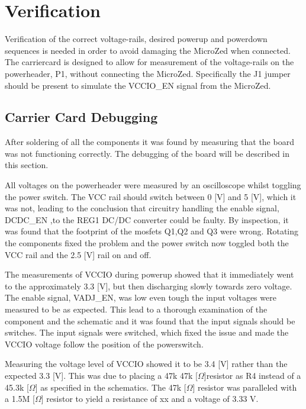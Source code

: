\section{Verification}
Verification of the correct voltage-rails, desired powerup and powerdown sequences is needed in order to avoid damaging the MicroZed when connected.
The carriercard is designed to allow for measurement of the voltage-rails on the powerheader, P1, without connecting the MicroZed.
Specifically the J1 jumper should be present to simulate the VCCIO\_EN signal from the MicroZed.

\subsection{Carrier Card Debugging}
After soldering of all the components it was found by measuring that the board was not functioning correctly.
The debugging of the board will be described in this section.

All voltages on the powerheader were measured by an oscilloscope whilst toggling the power switch.
The VCC rail should switch between 0 [V] and 5 [V], which it was not, leading to the conclusion that circuitry handling the enable signal, DCDC\_EN ,to the REG1 DC/DC converter could be faulty.
By inspection, it was found that the footprint of the mosfets Q1,Q2 and Q3 were wrong.
Rotating the components fixed the problem and the power switch now toggled both the VCC rail and the 2.5 [V] rail on and off.

The measurements of VCCIO during powerup showed that it immediately went to the approximately 3.3 [V], but then discharging slowly towards zero voltage.
The enable signal, VADJ\_EN, was low even tough the input voltages were measured to be as expected.
This lead to a thorough examination of the component and the schematic and it was found that the input signals should be switches.
The input signals were switched, which fixed the issue and made the VCCIO voltage follow the position of the powerswitch.

Measuring the voltage level of VCCIO showed it to be 3.4 [V] rather than the expected 3.3 [V].
This was due to placing a 47k 47k [$\Omega$]resistor as R4 instead of a 45.3k [$\Omega$] as specified in the schematics.
The 47k [$\Omega$] resistor was paralleled with a 1.5M [$\Omega$] resistor to yield a resistance of xx and a voltage of 3.33 V.


